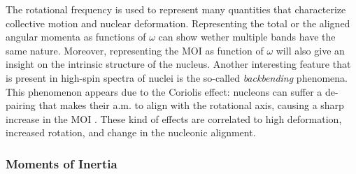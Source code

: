The rotational frequency is used to represent many quantities that characterize collective motion and nuclear deformation. Representing the total or the aligned angular momenta as functions of $\omega$ can show wether multiple bands have the same nature. Moreover, representing the MOI as function of $\omega$ will also give an insight on the intrinsic structure of the nucleus. Another interesting feature that is present in high-spin spectra of nuclei is the so-called \emph{backbending} phenomena. This phenomenon appears due to the Coriolis effect: nucleons can suffer a de-pairing that makes their a.m. to align with the rotational axis, causing a sharp increase in the MOI \cite{ring2004nuclear,kvasil2004backbending}. These kind of effects are correlated to high deformation, increased rotation, and change in the nucleonic alignment.

\subsubsection{Moments of Inertia}
\label{subsection-moments-of-inertia}

